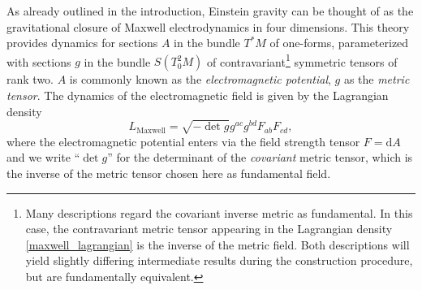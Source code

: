 As already outlined in the introduction, Einstein gravity can be thought of as the gravitational closure of Maxwell electrodynamics in four dimensions. This theory provides dynamics for sections $A$ in the bundle $T^\ast M$ of one-forms, parameterized with sections $g$ in the bundle $S(T^2_0M)$ of contravariant\footnote{Many descriptions regard the covariant inverse metric as fundamental. In this case, the contravariant metric tensor appearing in the Lagrangian density \eqref{maxwell_lagrangian} is the inverse of the metric field. Both descriptions will yield slightly differing intermediate results during the construction procedure, but are fundamentally equivalent.} symmetric tensors of rank two. $A$ is commonly known as the \emph{electromagnetic potential}, $g$ as the \emph{metric tensor}. The dynamics of the electromagnetic field is given by the Lagrangian density
\begin{equation}\label{lagrangian_maxwell}
  L_\text{Maxwell} = \sqrt{-\operatorname{det} g} g^{ac}g^{bd} F_{ab} F_{cd},
\end{equation}
where the electromagnetic potential enters via the field strength tensor $F = \mathrm dA$ and we write ``$\operatorname{det}g$'' for the determinant of the \emph{covariant} metric tensor, which is the inverse of the metric tensor chosen here as fundamental field.

